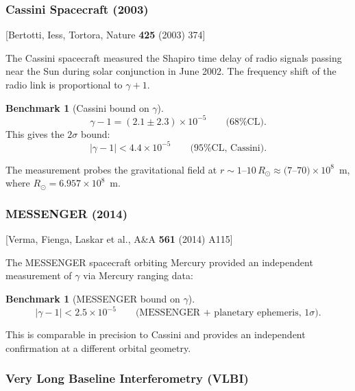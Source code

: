 \documentclass[11pt,a4paper]{article}
\theoremstyle{plain}
\theoremstyle{definition}
\newtheorem{benchmark}[theorem]{Benchmark}
\theoremstyle{remark}
\newcommand{\fromlit}[1]{\textcolor{sctblue}{\textsf{[#1]}}}
\begin{document}
\subsubsection{Cassini Spacecraft (2003)}

\fromlit{Bertotti, Iess, Tortora, Nature \textbf{425} (2003) 374}

The Cassini spacecraft measured the Shapiro time delay of radio
signals passing near the Sun during solar conjunction in June 2002.
The frequency shift of the radio link is proportional to $\gamma + 1$.

\begin{benchmark}[Cassini bound on $\gamma$]\label{bench:cassini}
\begin{equation}\label{eq:cassini}
  \gamma - 1 = (2.1 \pm 2.3) \times 10^{-5}
  \qquad\text{(68\% CL)}.
\end{equation}
This gives the $2\sigma$ bound:
\begin{equation}\label{eq:cassini-2sigma}
  |\gamma - 1| < 4.4 \times 10^{-5}
  \qquad\text{(95\% CL, Cassini)}.
\end{equation}
\end{benchmark}

\noindent The measurement probes the gravitational field at
$r \sim 1$--$10\,R_\odot \approx (7$--$70) \times 10^8$~m, where
$R_\odot = 6.957 \times 10^8$~m.

\subsubsection{MESSENGER (2014)}

\fromlit{Verma, Fienga, Laskar et al., A\&A \textbf{561} (2014) A115}

The MESSENGER spacecraft orbiting Mercury provided an independent
measurement of $\gamma$ via Mercury ranging data:

\begin{benchmark}[MESSENGER bound on $\gamma$]\label{bench:messenger}
\begin{equation}\label{eq:messenger}
  |\gamma - 1| < 2.5 \times 10^{-5}
  \qquad\text{(MESSENGER + planetary ephemeris, 1$\sigma$)}.
\end{equation}
\end{benchmark}

\noindent This is comparable in precision to Cassini and provides
an independent confirmation at a different orbital geometry.

\subsubsection{Very Long Baseline Interferometry (VLBI)}
\end{document}
